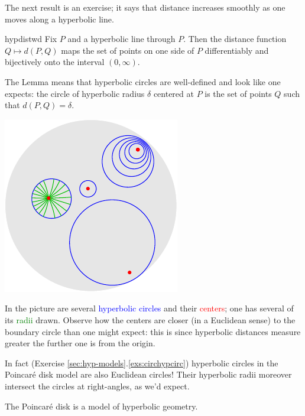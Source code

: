 \begin{minipage}[t]{0.65\linewidth}\vspace{-5pt}
	The next result is an exercise; it says that distance increases smoothly as one moves along a hyperbolic line.
	
	\begin{lemm}{}{hypdistwd}
		Fix $P$ and a hyperbolic line through $P$. Then the distance function $Q\mapsto d(P,Q)$ maps the set of points on one side of $P$ differentiably and bijectively onto the interval $(0,\infty)$.
	\end{lemm}
	
	The Lemma means that hyperbolic circles are well-defined and look like one expects: the circle of hyperbolic radius $\delta$ centered at $P$ is the set of points $Q$ such that $d(P,Q)=\delta$.
\end{minipage}
\hfill
	\begin{minipage}[t]{0.34\linewidth}\vspace{-5pt}
\flushright\includegraphics[scale=0.95]{hyper-circle}
\end{minipage}\medbreak

In the picture are several \textcolor{blue}{hyperbolic circles} and their \textcolor{red}{centers}; one has several of its \textcolor{Green}{radii} drawn. Observe how the centers are closer (in a Euclidean sense) to the boundary circle than one might expect: this is since hyperbolic distances measure greater the further one is from the origin.\smallbreak

In fact (Exercise \ref*{sec:hyp-models}.\ref{exs:circhypcirc}) hyperbolic circles in the Poincaré disk model are also Euclidean circles! Their hyperbolic radii moreover intersect the circles at right-angles, as we'd expect.


\begin{thm}{}{}
	The Poincaré disk is a model of hyperbolic geometry.
\end{thm}

